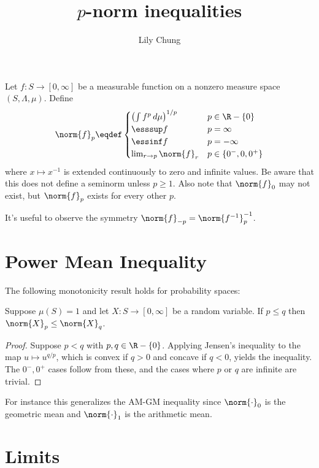 \documentclass{article}
\title{$p$-norm inequalities}
\author{Lily Chung}
\date{}
\begin{document}
\maketitle

Let $f : S \to [0, \infty]$ be a measurable function on a nonzero measure space $(S, \Lambda, \mu)$.
Define \[\norm{f}_p \eqdef \begin{cases}
  \left(\int f^p\,d\mu\right)^{1/p} & p \in \R - \{0\} \\
  \esssup f & p = \infty \\
  \essinf f & p = -\infty \\
  \lim_{r \to p} \norm{f}_r & p \in \{0^-, 0, 0^+\} \\
  \end{cases}
\]
where $x \mapsto x^{-1}$ is extended continuously to zero and infinite values.
Be aware that this does not define a seminorm unless $p \ge 1$.
Also note that $\norm{f}_0$ may not exist, but $\norm{f}_p$ exists for every other $p$.

It's useful to observe the symmetry $\norm{f}_{-p} = \norm{f^{-1}}_p^{-1}$.

\section*{Power Mean Inequality}

The following monotonicity result holds for probability spaces:

\begin{theorem}\label{thm:power mean}
  Suppose $\mu(S) = 1$ and let $X : S \to [0, \infty]$ be a random variable.
  If $p \le q$ then $\norm{X}_p \le \norm{X}_q$.
\end{theorem}
\begin{proof}
  Suppose $p < q$ with $p, q \in \R - \{0\}$.
  Applying Jensen's inequality to the map $u \mapsto u^{q/p}$,
  which is convex if $q > 0$ and concave if $q < 0$,
  yields the inequality.
  The $0^-, 0^+$ cases follow from these,
  and the cases where $p$ or $q$ are infinite are trivial.
\end{proof}

For instance this generalizes the AM-GM inequality since $\norm{\cdot}_0$ is the geometric mean and $\norm{\cdot}_1$ is the arithmetic mean.

\section*{Limits}
\end{document}
